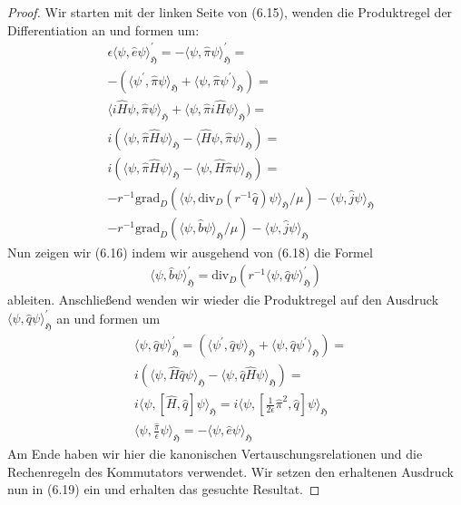 \documentclass[11pt,a4paper,leqno]{report}
\numberwithin{equation}{chapter}
\begin{document}
\begin{proof}
Wir starten mit der linken Seite von (6.15), wenden die Produktregel der Differentiation an und formen um:
\begin{align*}
	&\epsilon\langle \psi, \hat{e}\psi\rangle_{\mathfrak{H}}^\prime = -\langle \psi, \hat{\pi}\psi\rangle_{\mathfrak{H}}^\prime=\\
	&-(\langle \psi^\prime, \hat{\pi}\psi\rangle_{\mathfrak{H}}+\langle \psi, \hat{\pi}\psi^\prime\rangle_{\mathfrak{H}})=\\
	&\langle i\hat{H}\psi, \hat{\pi}\psi\rangle_{\mathfrak{H}}+\langle \psi, \hat{\pi}i\hat{H}\psi\rangle_{\mathfrak{H}})=\\
	&i(\langle \psi, \hat{\pi}\hat{H}\psi\rangle_{\mathfrak{H}} - \langle \hat{H}\psi, \hat{\pi}\psi\rangle_{\mathfrak{H}})=\\
	&i(\langle \psi, \hat{\pi}\hat{H}\psi\rangle_{\mathfrak{H}} - \langle \psi, \hat{H}\hat{\pi}\psi\rangle_{\mathfrak{H}})=\\
	&-r^{-1} \text{grad}_D(\langle\psi,\text{div}_D(r^{-1}\hat{q})\psi\rangle_{\mathfrak{H}}/\mu) -  \langle \psi, \hat{j} \psi\rangle_{\mathfrak{H}}\\
	&-r^{-1} \text{grad}_D(\langle\psi,\hat{b}\psi\rangle_{\mathfrak{H}}/\mu) -  \langle \psi, \hat{j} \psi\rangle_{\mathfrak{H}}
\end{align*}
Nun zeigen wir (6.16) indem wir ausgehend von (6.18) die Formel
	\begin{align}
\langle \psi, \hat{b}\psi\rangle_{\mathfrak{H}}^\prime = \text{div}_D(r^{-1}\langle \psi, \hat{q}\psi\rangle_{\mathfrak{H}}^\prime)
\end{align}
ableiten. Anschließend wenden wir wieder die Produktregel auf den Ausdruck $\langle \psi, \hat{q}\psi\rangle_{\mathfrak{H}}^\prime$ an und formen um
	\begin{align*}
	&\langle \psi, \hat{q}\psi\rangle_{\mathfrak{H}}^\prime= (\langle \psi^\prime, \hat{q}\psi\rangle_{\mathfrak{H}}+\langle \psi, \hat{q}\psi^\prime\rangle_{\mathfrak{H}})=\\
	&i(\langle \psi, \hat{H}\hat{q}\psi\rangle_{\mathfrak{H}} - \langle \psi, \hat{q}\hat{H}\psi\rangle_{\mathfrak{H}})=\\
	&i\langle \psi, [\hat{H},\hat{q}]\psi\rangle_{\mathfrak{H}}=i\langle \psi, [\frac{1}{2\epsilon}\hat{\pi}^2,\hat{q}]\psi\rangle_{\mathfrak{H}}\\
	&\langle \psi, \frac{\hat{\pi}}{\epsilon}\psi\rangle_{\mathfrak{H}}=-\langle \psi, \hat{e}\psi\rangle_{\mathfrak{H}}
\end{align*}		
Am Ende haben wir hier die kanonischen Vertauschungsrelationen und die Rechenregeln des Kommutators verwendet.
Wir setzen den erhaltenen Ausdruck nun in (6.19) ein und erhalten das gesuchte Resultat.
\end{proof}
\end{document}
